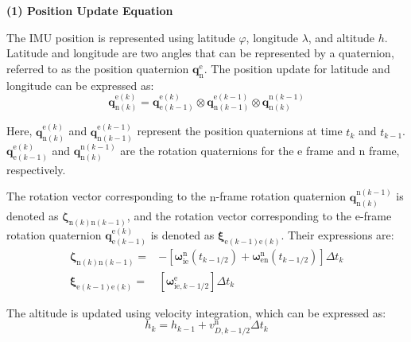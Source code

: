 \documentclass{article}
\begin{document}
\textbf{(1) Position Update Equation}

The IMU position is represented using latitude $\varphi$, longitude $\lambda$, and altitude $h$. Latitude and longitude are two angles that can be represented by a quaternion, referred to as the position quaternion $\mathbf{q}_{\mathrm{n}}^{\mathrm{e}}$. The position update for latitude and longitude can be expressed as:
\begin{equation}
    \mathbf{q}_{\mathrm{n}(k)}^{\mathrm{e}(k)} = \mathbf{q}_{\mathrm{e}(k-1)}^{\mathrm{e}(k)} \otimes \mathbf{q}_{\mathrm{n}(k-1)}^{\mathrm{e}(k-1)} \otimes \mathbf{q}_{\mathrm{n}(k)}^{\mathrm{n}(k-1)} 
    \label{eq:position-quaternion-update}
\end{equation}

Here, $\mathbf{q}_{\mathrm{n}(k)}^{\mathrm{e}(k)}$ and $\mathbf{q}_{\mathrm{n}(k-1)}^{\mathrm{e}(k-1)}$ represent the position quaternions at time $t_{k}$ and $t_{k-1}$. $\mathbf{q}_{\mathrm{e}(k-1)}^{\mathrm{e}(k)}$ and $\mathbf{q}_{\mathrm{n}(k)}^{\mathrm{n}(k-1)}$ are the rotation quaternions for the $\mathrm{e}$ frame and $\mathrm{n}$ frame, respectively.

The rotation vector corresponding to the $\mathrm{n}$-frame rotation quaternion $\mathbf{q}_{\mathrm{n}(k)}^{\mathrm{n}(k-1)}$ is denoted as $\boldsymbol{\zeta}_{\mathrm{n}(k)\mathrm{n}(k-1)}$, and the rotation vector corresponding to the $\mathrm{e}$-frame rotation quaternion $\mathbf{q}_{\mathrm{e}(k-1)}^{\mathrm{e}(k)}$ is denoted as $\boldsymbol{\xi}_{\mathrm{e}(k-1)\mathrm{e}(k)}$. Their expressions are:
\begin{equation}
    \begin{aligned}
        \boldsymbol{\zeta}_{\mathrm{n}(k)\mathrm{n}(k-1)} = & -\left[ \boldsymbol{\omega}_{\mathrm{ie}}^{\mathrm{n}}(t_{k-1/2}) + \boldsymbol{\omega}_{\mathrm{en}}^{\mathrm{n}}(t_{k-1/2}) \right] \Delta t_k \\
        \boldsymbol{\xi}_{\mathrm{e}(k-1)\mathrm{e}(k)} = & \left[ \boldsymbol{\omega}_{\mathrm{ie}, k-1/2}^{\mathrm{e}} \right] \Delta t_k
    \end{aligned}
    \label{eq:n-frame-e-frame-rotation-vector}
\end{equation}

The altitude is updated using velocity integration, which can be expressed as:
\begin{equation}
    h_{k} = h_{k-1} + {v}_{D,k-1/2}^{\mathrm{n}} \Delta t_k
    \label{eq:position-height-update}
\end{equation}
\end{document}
